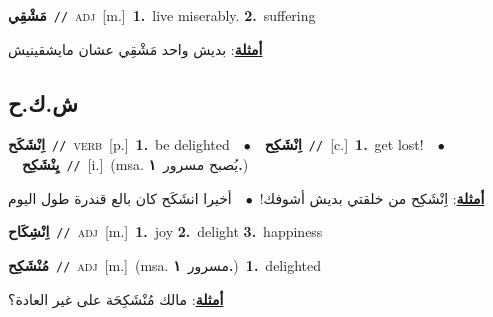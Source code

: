 \documentclass[10pt,a4paper,twoside]{article} %
\begin{document}
\begin{multicols}{2}
{\setlength\topsep{0pt}\textbf{\foreignlanguage{arabic}{مَشْقِي}}\ {\color{gray}\texttt{//}\color{black}}\ \textsc{adj}\ [m.]\ \textbf{1.}~live miserably.  \textbf{2.}~suffering\  \begin{flushright}\color{gray}\foreignlanguage{arabic}{\textbf{\underline{\foreignlanguage{arabic}{أمثلة}}}: بديش واحد مَشْقِي عشان مايشقينيش}\end{flushright}\color{black}} \vspace{2mm}

\vspace{-3mm}
\subsection*{\color{blue}\foreignlanguage{arabic}{ش.ك.ح}\color{blue}{}} 

{\setlength\topsep{0pt}\textbf{\foreignlanguage{arabic}{اِنْشَكَح}}\ {\color{gray}\texttt{//}\color{black}}\ \textsc{verb}\ [p.]\ \textbf{1.}~be delighted\ \ $\bullet$\ \ \setlength\topsep{0pt}\textbf{\foreignlanguage{arabic}{اِنْشَكِح}}\ {\color{gray}\texttt{//}\color{black}}\ [c.]\ \textbf{1.}~get lost!\ \ $\bullet$\ \ \setlength\topsep{0pt}\textbf{\foreignlanguage{arabic}{يِنْشَكِح}}\ {\color{gray}\texttt{//}\color{black}}\ [i.]\ \color{gray}(msa. \foreignlanguage{arabic}{يُصبح مسرور}~\foreignlanguage{arabic}{\textbf{١.}})\color{black}\  \begin{flushright}\color{gray}\foreignlanguage{arabic}{\textbf{\underline{\foreignlanguage{arabic}{أمثلة}}}: اِنْشَكِح من خلقتي بديش أشوفك!\ $\bullet$\ \  أخيرا انشَكَح كان بالع قندرة طول اليوم}\end{flushright}\color{black}} \vspace{2mm}

{\setlength\topsep{0pt}\textbf{\foreignlanguage{arabic}{اِنْشِكَاح}}\ {\color{gray}\texttt{//}\color{black}}\ \textsc{adj}\ [m.]\ \textbf{1.}~joy  \textbf{2.}~delight  \textbf{3.}~happiness\ } \vspace{2mm}

{\setlength\topsep{0pt}\textbf{\foreignlanguage{arabic}{مُنْشَكِح}}\ {\color{gray}\texttt{//}\color{black}}\ \textsc{adj}\ [m.]\ \color{gray}(msa. \foreignlanguage{arabic}{مسرور}~\foreignlanguage{arabic}{\textbf{١.}})\color{black}\ \textbf{1.}~delighted\  \begin{flushright}\color{gray}\foreignlanguage{arabic}{\textbf{\underline{\foreignlanguage{arabic}{أمثلة}}}: مالك مُنْشَكِحَة على غير العادة؟}\end{flushright}\color{black}} \vspace{2mm}


\end{multicols}
\end{document}
